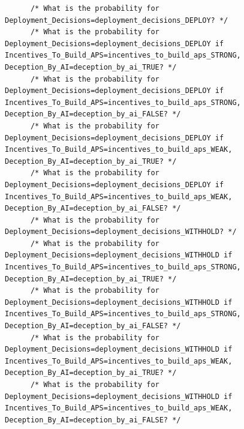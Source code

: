 \documentclass[
  11pt,
  letterpaper,
]{book}
\begin{document}
\begin{landscape}
\begin{verbatim}
      /* What is the probability for Deployment_Decisions=deployment_decisions_DEPLOY? */
      /* What is the probability for Deployment_Decisions=deployment_decisions_DEPLOY if Incentives_To_Build_APS=incentives_to_build_aps_STRONG, Deception_By_AI=deception_by_ai_TRUE? */
      /* What is the probability for Deployment_Decisions=deployment_decisions_DEPLOY if Incentives_To_Build_APS=incentives_to_build_aps_STRONG, Deception_By_AI=deception_by_ai_FALSE? */
      /* What is the probability for Deployment_Decisions=deployment_decisions_DEPLOY if Incentives_To_Build_APS=incentives_to_build_aps_WEAK, Deception_By_AI=deception_by_ai_TRUE? */
      /* What is the probability for Deployment_Decisions=deployment_decisions_DEPLOY if Incentives_To_Build_APS=incentives_to_build_aps_WEAK, Deception_By_AI=deception_by_ai_FALSE? */
      /* What is the probability for Deployment_Decisions=deployment_decisions_WITHHOLD? */
      /* What is the probability for Deployment_Decisions=deployment_decisions_WITHHOLD if Incentives_To_Build_APS=incentives_to_build_aps_STRONG, Deception_By_AI=deception_by_ai_TRUE? */
      /* What is the probability for Deployment_Decisions=deployment_decisions_WITHHOLD if Incentives_To_Build_APS=incentives_to_build_aps_STRONG, Deception_By_AI=deception_by_ai_FALSE? */
      /* What is the probability for Deployment_Decisions=deployment_decisions_WITHHOLD if Incentives_To_Build_APS=incentives_to_build_aps_WEAK, Deception_By_AI=deception_by_ai_TRUE? */
      /* What is the probability for Deployment_Decisions=deployment_decisions_WITHHOLD if Incentives_To_Build_APS=incentives_to_build_aps_WEAK, Deception_By_AI=deception_by_ai_FALSE? */

\end{verbatim}
\end{landscape}
\end{document}

